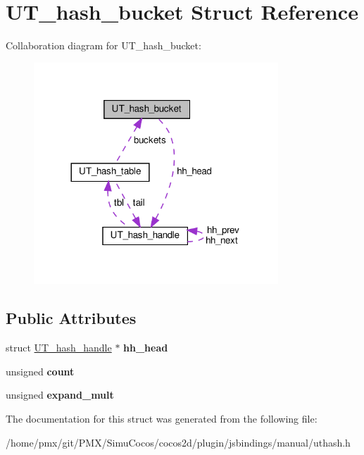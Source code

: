 \hypertarget{structUT__hash__bucket}{}\section{U\+T\+\_\+hash\+\_\+bucket Struct Reference}
\label{structUT__hash__bucket}


Collaboration diagram for U\+T\+\_\+hash\+\_\+bucket\+:
\nopagebreak
\begin{figure}[H]
\begin{center}
\leavevmode
\includegraphics[width=260pt]{structUT__hash__bucket__coll__graph}
\end{center}
\end{figure}
\subsection*{Public Attributes}
\begin{DoxyCompactItemize}
\item 
\mbox{\label{structUT__hash__bucket_a785a785132212378bb28fb4341cfecaf}} 
struct \hyperlink{structUT__hash__handle}{U\+T\+\_\+hash\+\_\+handle} $\ast$ {\bfseries hh\+\_\+head}
\item 
\mbox{\label{structUT__hash__bucket_a5d20cc12bdcbde360398910eefb45634}} 
unsigned {\bfseries count}
\item 
\mbox{\label{structUT__hash__bucket_a9b739c1b69c141e8198c0c64af643b2b}} 
unsigned {\bfseries expand\+\_\+mult}
\end{DoxyCompactItemize}


The documentation for this struct was generated from the following file\+:\begin{DoxyCompactItemize}
\item 
/home/pmx/git/\+P\+M\+X/\+Simu\+Cocos/cocos2d/plugin/jsbindings/manual/uthash.\+h\end{DoxyCompactItemize}
